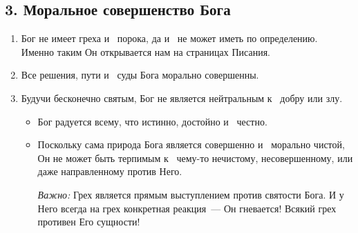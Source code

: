 \documentclass[a4paper,12pt]{article}
\begin{document}
\subsection{3. Моральное совершенство Бога}

\begin{enumerate}
    \item Бог не имеет греха и~ порока, да и~ не может иметь по определению. Именно таким Он открывается нам на страницах Писания.
    \item Все решения, пути и~ суды Бога морально совершенны.
    \item Будучи бесконечно святым, Бог не является нейтральным к~ добру или злу.
    \begin{itemize}
        \item Бог радуется всему, что истинно, достойно и~ честно.
        \item Поскольку сама природа Бога является совершенно и~ морально чистой, Он не может быть терпимым к~ чему-то нечистому, несовершенному, или даже направленному против Него. 
        
        \emph{Важно:} Грех является прямым выступлением против святости Бога. И у~ Него всегда на грех конкретная реакция~--- Он гневается! Всякий грех противен Его сущности!
    \end{itemize}
\end{enumerate}
\end{document}

